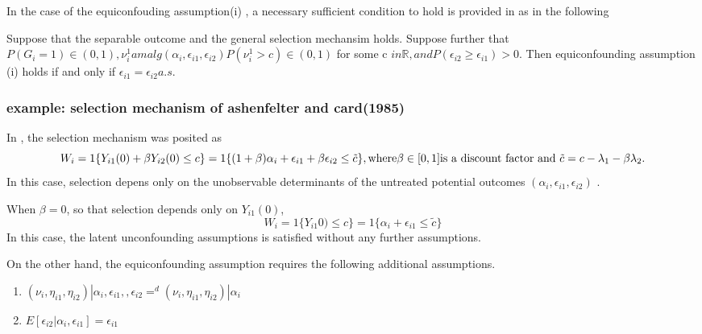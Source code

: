 \documentclass{article}
\begin{document}
 In the case of the equiconfouding assumption(i) , a necessary sufficient condition to hold is provided in \cite{ghanem et al} as in the following
 \begin{theorem}
 Suppose that the separable outcome and the general selection mechansim holds. Suppose further that $P(G_i = 1) \in (0,1) , \nu_i^1 amalg ( \alpha_i , \epsilon_{i1}, \epsilon_{i2} ) P( \nu_i^1 > c) \in (0,1) $ for some c $ in \mathbb{R}, and P (\epsilon_{i2} \geq \epsilon_{i1} ) > 0.$ Then equiconfounding assumption (i) holds if and only if $\epsilon_{i1} = \epsilon_{i2} a.s.$
 \end{theorem}
 
 

\subsubsection{example: selection mechanism of ashenfelter and card(1985)}
In \cite{ashenfelter and card 19 85} , the selection mechanism was posited as 
\begin{equation}
    W_i = 1\{ Y_{i1}(0) + \beta Y_{i2} ( 0) \leq c \} =  1 \{  (1 + \beta ) \alpha_i + \epsilon_{i1} + \beta \epsilon_{i2} \leq \tilde{c} \} ,\\
    \text{where} \beta \in [0,1] \text{is a discount factor and } \tilde{c} = c - \lambda_1 - \beta \lambda_2 .\\
    
\end{equation}
In this case, selection depens only on the unobservable determinants of the untreated potential outcomes $( \alpha_i , \epsilon_{i1}, \epsilon_{i2} ) $ .

When $\beta = 0 $, so that selection depends only on $Y_{i1} (0) $, 
\begin{equation}
    W_i = 1 \{ Y_{i1}0) \leq c \} = 1 \{ \alpha_i  + \epsilon_{i1} \leq \tilde{c} \}
    
\end{equation}
In this case, the latent unconfounding assumptions is satisfied without any further assumptions. 

On the other hand,  the equiconfounding assumption requires the following additional assumptions.
\begin{enumerate}
    \item $ ( \nu_i, \eta_{i1} , \eta_{i2} ) | \alpha_i , \epsilon_{i1}, , \epsilon_{i2} =^d ( \nu_i , \eta_{i1}, \eta_{i2} ) | \alpha_i$
    \item $ E [ \epsilon_{i2} | \alpha_i , \epsilon_{i1} ] = \epsilon_{i1}$
\end{enumerate}
\end{document}
